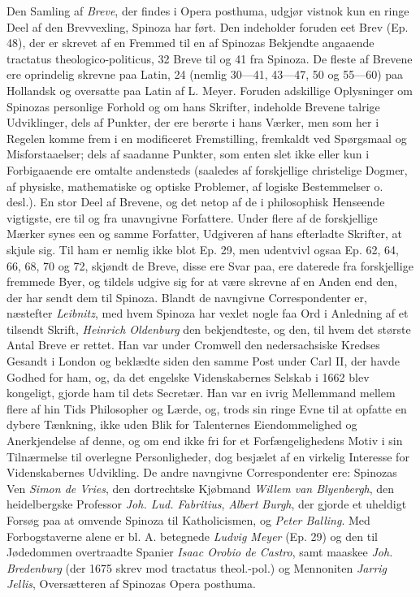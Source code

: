 \documentclass[12pt,a4paper]{book}
\newcommand{\opage}[1]{\marginnote{\footnotesize\textit{[#1]}}}
\begin{document}
Den Samling af \emph{Breve}, der findes i Opera posthuma, udgjør vistnok
kun en ringe Deel af den Brevvexling, Spinoza har ført. Den indeholder
foruden eet Brev (Ep. 48), der er skrevet af en Fremmed til en af Spinozas
Bekjendte angaaende tractatus theologico-politicus, 32 Breve til og 41 fra
Spinoza. De fleste af Brevene ere oprindelig skrevne paa Latin, 24 (nemlig
30---41, 43---47, 50 og 55---60) paa Hollandsk og oversatte paa Latin af
L. Meyer. Foruden adskillige Oplysninger om Spinozas personlige Forhold og
om hans Skrifter, indeholde Brevene talrige Udviklinger, dels af Punkter,
der ere berørte i hans Værker, men som her i Regelen komme frem i en
modificeret Fremstilling, fremkaldt ved Spørgsmaal og Misforstaaelser;
dels af saadanne Punkter, som enten slet ikke eller kun i Forbigaaende
\opage{40} ere omtalte andensteds (saaledes af forskjellige christelige Dogmer, af
physiske, mathematiske og optiske Problemer, af logiske Bestemmelser o.
desl.). En stor Deel af Brevene, og det netop af de i philosophisk
Henseende vigtigste, ere til og fra unavngivne Forfattere. Under flere af
de forskjellige Mærker synes een og samme Forfatter, Udgiveren af hans
efterladte Skrifter, at skjule sig. Til ham er nemlig ikke blot Ep. 29,
men udentvivl ogsaa Ep. 62, 64, 66, 68, 70 og 72, skjøndt de Breve, disse
ere Svar paa, ere daterede fra forskjellige fremmede Byer, og tildels
udgive sig for at være skrevne af en Anden end den, der har sendt dem til
Spinoza. Blandt de navngivne Correspondenter er, næstefter
\emph{Leibnitz}, med hvem Spinoza har vexlet nogle faa Ord i Anledning af
et tilsendt Skrift, \emph{Heinrich Oldenburg} den bekjendteste, og den,
til hvem det største Antal Breve er rettet. Han var under Cromwell den
nedersachsiske Kredses Gesandt i London og beklædte siden den samme Post
under Carl II, der havde Godhed for ham, og, da det engelske
Videnskabernes Selskab i 1662 blev kongeligt, gjorde ham til dets
Secretær. Han var en ivrig Mellemmand mellem flere af hin Tids Philosopher
og Lærde, og, trods sin ringe Evne til at opfatte en dybere Tænkning, ikke
uden Blik for Talenternes Eiendommelighed og Anerkjendelse af denne, og om
end ikke fri for et Forfængelighedens Motiv i sin Tilnærmelse til overlegne
Personligheder, dog besjælet af en virkelig Interesse for Videnskabernes
Udvikling. De andre navngivne Correspondenter ere: Spinozas Ven
\emph{Simon de Vries}, den dortrechtske Kjøbmand \emph{Willem van
Blyenbergh}, den heidelbergske Professor \emph{Joh. Lud. Fabritius},
\emph{Albert Burgh}, der gjorde et uheldigt Forsøg paa at omvende Spinoza
til Katholicismen, og \emph{Peter Balling}. Med Forbogstaverne alene er
bl. A. betegnede \emph{Ludvig Meyer} (Ep. 29) og den til Jødedommen
overtraadte Spanier \emph{Isaac Orobio de Castro}, samt maaskee \emph{Joh.
Bredenburg} (der 1675 skrev mod tractatus theol.-pol.) og Mennoniten
\emph{Jarrig Jellis}, Oversætteren af Spinozas Opera posthuma.
\end{document}
